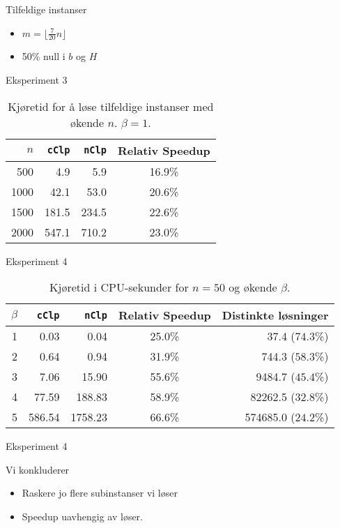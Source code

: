 \documentclass{beamer}
\begin{document}
\begin{frame}{Tilfeldige instanser}
\begin{itemize}
\item $m = \lfloor \frac{7}{20}n \rfloor$
\item 50\% null i $b$ og $H$
\end{itemize}
\end{frame}



\begin{frame}{Eksperiment 3}
\begin{table}[ht!]
    \centering
    \caption{Kjøretid for å løse tilfeldige instanser med økende $n$. $\beta = 1$.}
    \label{table:expfour}
\begin{tabular}{rrrc}
    $n$ & \texttt{cClp}  & \texttt{nClp}  & Relativ Speedup \\ \hline
    500 & 4.9   & 5.9   & 16.9\% \\
   1000 & 42.1  & 53.0  & 20.6\% \\
   1500 & 181.5 & 234.5 & 22.6\% \\
   2000 & 547.1 & 710.2 & 23.0\%
\end{tabular}
\end{table}
\end{frame}



\begin{frame}{Eksperiment 4}
\begin{table}[ht!]
\centering
\caption{Kjøretid i CPU-sekunder for $n = 50$ og økende $\beta$.}
\begin{tabular}{rrrcr}
      $\beta$ & \texttt{cClp} & \texttt{nClp} & Relativ Speedup & Distinkte løsninger\\ \hline
       1  & 0.03 & 0.04 & 25.0\% & 37.4 ($74.3$\%) \\
       2  & 0.64 & 0.94 & 31.9\% & 744.3 ($58.3$\%) \\
       3  & 7.06 & 15.90 & 55.6\% & 9484.7 ($45.4$\%) \\
       4  & 77.59 & 188.83 & 58.9\% & 82262.5 ($32.8$\%) \\
       5  & 586.54 & 1758.23 & 66.6\% & 574685.0 ($24.2$\%) \\
\end{tabular}
\label{table:exptwo}
\end{table}
\end{frame}



\begin{frame}{Eksperiment 4}

\end{frame}



\begin{frame}{Vi konkluderer}
\begin{itemize}
\item Raskere jo flere subinstanser vi løser
\item Speedup uavhengig av løser.
\end{itemize}
\end{frame}
\end{document}
